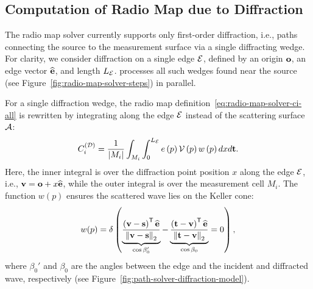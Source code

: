 \subsection{Computation of Radio Map due to Diffraction}
\label{sec:radio-map-solver-diffraction}

The \SRT{} radio map solver currently supports only first-order diffraction, i.e., paths connecting the source to the measurement surface via a single diffracting wedge. For clarity, we consider diffraction on a single edge ${\cal E}$, defined by an origin $\mathbf{o}$, an edge vector $\widehat{\mathbf{e}}$, and length $L_{{\cal E}}$. \SRT{} processes all such wedges found near the source (see Figure~\ref{fig:radio-map-solver-steps}) in parallel.

For a single diffraction wedge, the radio map definition~\eqref{eq:radio-map-solver-ci-all} is rewritten by integrating along the edge ${\cal E}$ instead of the scattering surface ${\cal A}$:
\begin{equation}
    \label{eq:radio-map-solver-ci-D}
    C_i^{({\cal D})} = \frac{1}{\left| M_i \right|} \int_{M_i} \int_{0}^{L_{{\cal E}}} e \left( p \right) {\cal V}\left( p \right) w \left( p \right) dx d\mathbf{t}.
\end{equation}
Here, the inner integral is over the diffraction point position $x$ along the edge ${\cal E}$, i.e., $\mathbf{v} = \mathbf{o} + x \widehat{\mathbf{e}}$, while the outer integral is over the measurement cell $M_i$. The function $w(p)$ ensures the scattered wave lies on the Keller cone:
\begin{equation}
    \label{eq:radio-map-solver-ci-D-condition}
    w(p) = \delta \left( \underbrace{\frac{\left( \mathbf{v} - \mathbf{s} \right) ^{\mathsf{T}} \widehat{\mathbf{e}}}{\left\lVert\mathbf{v} - \mathbf{s}\right\rVert_2}}_{\cos \beta_0'} - \underbrace{\frac{\left( \mathbf{t} - \mathbf{v} \right) ^{\mathsf{T}} \widehat{\mathbf{e}}}{\left\lVert\mathbf{t} - \mathbf{v}\right\rVert_2}}_{\cos \beta_0} = 0 \right),
\end{equation}
where $\beta_0'$ and $\beta_0$ are the angles between the edge and the incident and diffracted wave, respectively (see Figure~\ref{fig:path-solver-diffraction-model}).


